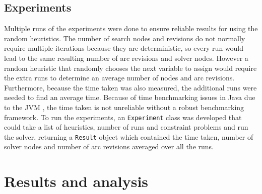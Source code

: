 \documentclass{article}
\begin{document}
\subsection{Experiments}
Multiple runs of the experiments were done to ensure reliable results for using the random heuristics. The number of search nodes and revisions do not normally require multiple iterations because they are deterministic, so every run would lead to the same resulting number of arc revisions and solver nodes. However a random heuristic that randomly chooses the next variable to assign would require the extra runs to determine an average number of nodes and arc revisions. Furthermore, because the time taken was also measured, the additional runs were needed to find an average time. Because of time benchmarking issues in Java due to the JVM \cite{jvm-benchmark}, the time taken is not unreliable without a robust benchmarking framework. 
\n
To run the experiments, an \texttt{Experiment} class was developed that could take a list of heuristics, number of runs and constraint problems and run the solver, returning a \texttt{Result} object which contained the time taken, number of solver nodes and number of arc revisions averaged over all the runs. 

\section{Results and analysis}
\newcommand{\cspplot}[6]{
\begin{tikzpicture}[scale=0.55]
\begin{axis}[
	title = {\textbf{#1}},
	legend pos=#6,
	ymode=log,
	xlabel={#2},
	ylabel={#3}
]



\addplot+[only marks, fill opacity=0.2,
		discard if not={Heuristic}{No heuristic},
] table [x=#2, y=#3, col sep=comma] {data/#4};
\addlegendentry{Static Ascending}

\addplot+[only marks, fill opacity=0.2,
		discard if not={Heuristic}{Smallest Domain First},
] table [x=#2, y=#3, col sep=comma] {data/#4};
\addlegendentry{SDF}

\addplot+[only marks, fill opacity=0.2,
		discard if not={Heuristic}{Largest Domain First},
] table [x=#2, y=#3, col sep=comma] {data/#4};
\addlegendentry{LDF}

\addplot+[only marks, fill opacity=0.2,
		discard if not={Heuristic}{Maximum Degree},
] table [x=#2, y=#3, col sep=comma] {data/#4};
\addlegendentry{Maximum Degree}

\addplot+[only marks, fill opacity=0.2,
		discard if not={Heuristic}{Random},
] table [x=#2, y=#3, col sep=comma] {data/#4};
\addlegendentry{Random}


#5
\end{axis}
\end{tikzpicture}
}
\end{document}

